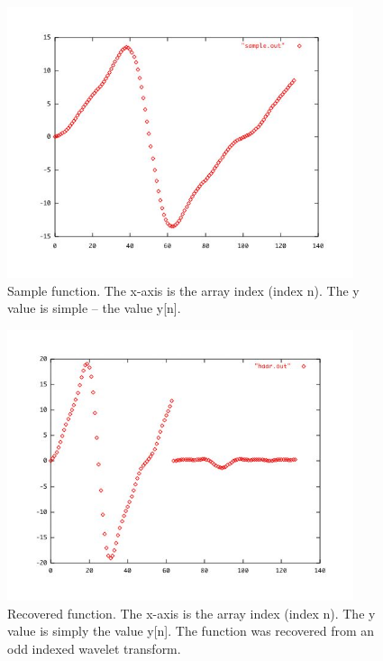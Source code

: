 \documentclass[11pt]{article}
\begin{document}
\begin{figure}
\includegraphics [width=4in]{sample.jpg}
\caption{Sample function.  The x-axis is the array index (index n).  The y value is simple -- the value y[n]. }
\label{sample}
\end{figure}



\begin{figure}
\includegraphics [width=4in]{recovered.jpg}
\caption{Recovered function.  The x-axis is the array index (index n).  The y value is simply the value y[n].  The function was recovered from an odd indexed wavelet transform. }
\label{recoverOdd}
\end{figure}
\end{document}
